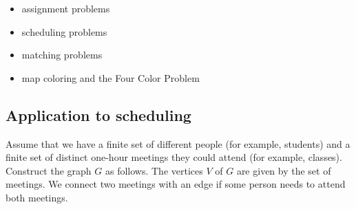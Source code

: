 \begin{itemize}
\item assignment problems

\item scheduling problems

\item matching problems

\item map coloring and the Four Color Problem
\end{itemize}


\subsection{Application to scheduling}

Assume that we have a finite set of different people (for example, students)
and a finite set of distinct one-hour meetings they could attend (for example,
classes). Construct the
graph $G$ as follows. The vertices $V$ of $G$ are given by the set of
meetings. We connect two meetings with an edge if some person
needs to attend both meetings. 

